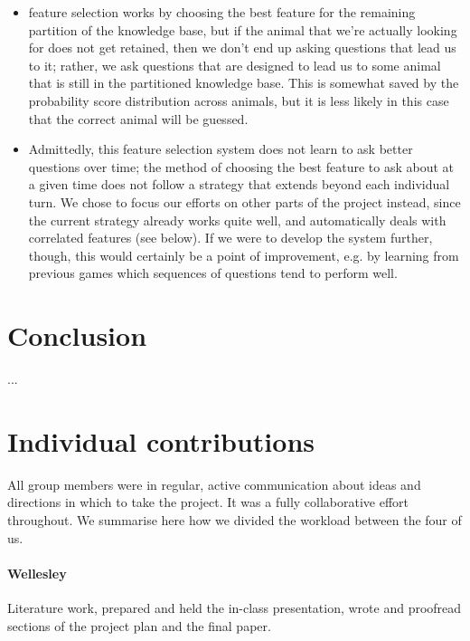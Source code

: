 \documentclass[11pt,a4paper]{article}
\begin{document}
\begin{itemize}
\item feature selection works by choosing the best feature for the remaining partition of the knowledge base, but if the animal that we're actually looking for does not get retained, then we don't end up asking questions that lead us to it; rather, we ask questions that are designed to lead us to some animal that is still in the partitioned knowledge base. This is somewhat saved by the probability score distribution across animals, but it is less likely in this case that the correct animal will be guessed.
\item Admittedly, this feature selection system does not learn to ask better questions over time; the method of choosing the best feature to ask about at a given time does not follow a strategy that extends beyond each individual turn.
We chose to focus our efforts on other parts of the project instead, since the current strategy already works quite well, and automatically deals with correlated features (see below).
If we were to develop the system further, though, this would certainly be a point of improvement, e.g. by learning from previous games which sequences of questions tend to perform well.
\end{itemize}

\section{Conclusion}
\label{sec:concl}

...




\appendix

\section{Individual contributions}
\label{app:contributions}

All group members were in regular, active communication about ideas and directions in which to take the project.
It was a fully collaborative effort throughout.
We summarise here how we divided the workload between the four of us.

\paragraph{Wellesley} Literature work, prepared and held the in-class presentation, wrote and proofread sections of the project plan and the final paper.
\end{document}
